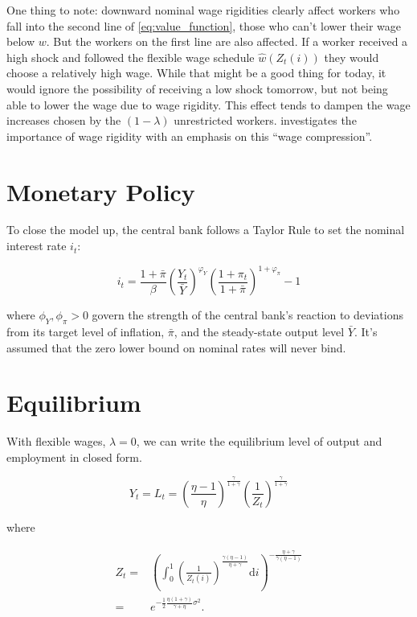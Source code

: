 \documentclass[12pt,a4paper]{scrartcl}            %
\begin{document}
One thing to note: downward nominal wage rigidities clearly affect workers who fall into the second line of \ref{eq:value_function}, those who can't lower their wage below $w$.
But the workers on the first line are also affected.
If a worker received a high shock and followed the flexible wage schedule $\hat{w}(Z_t(i))$ they would choose a relatively high wage.
While that might be a good thing for today, it would ignore the possibility of receiving a low shock tomorrow, but not being able to lower the wage due to wage rigidity.
This effect tends to dampen the wage increases chosen by the $(1 - \lambda)$ unrestricted workers.
\cite{elsby_2009} investigates the importance of wage rigidity with an emphasis on this ``wage compression''.

\section{Monetary Policy}
\label{sec:monetary_policy}

To close the model up, the central bank follows a Taylor Rule to set the nominal interest rate $i_t$:

\begin{equation}
    \label{eq:taylor_rule}
    i_t = \frac{1 + \bar{\pi}}{\beta} \left( \frac{Y_t}{\bar{Y}} \right)^{\varphi_Y} \left( \frac{1 + \pi_t}{1 + \bar{\pi}} \right)^{1 + \varphi_{\pi}} - 1
\end{equation}

where $\phi_Y, \phi_{\pi} > 0$ govern the strength of the central bank's reaction to deviations from its target level of inflation, $\bar{\pi}$, and the steady-state output level $\bar{Y}$.
It's assumed that the zero lower bound on nominal rates will never bind.

\section{Equilibrium}
\label{sec:equilibrium}

With flexible wages, $\lambda = 0$, we can write the equilibrium level of output and employment in closed form.

\begin{equation}
    \label{eq:output_flexible}
    Y_t = L_t = \left( \frac{\eta - 1}{\eta} \right)^{\frac{\gamma}{1 + \gamma}} \left( \frac{1}{Z_t} \right)^{\frac{\gamma}{1 + \gamma}}
\end{equation}

where

\begin{align}
    Z_t =& \left( \int_{0}^{1}\! \left( \frac{1}{Z_t(i)} \right)^{\frac{\gamma(\eta - 1)}{\eta + \gamma}} \mathrm{d}i \right)^{-\frac{\eta + \gamma}{\gamma(\eta - 1)}}\\
        =& e^{-\frac{1}{2} \frac{\eta(1 + \gamma)}{\gamma + \eta}\sigma^2 }.
\end{align}
\end{document}
